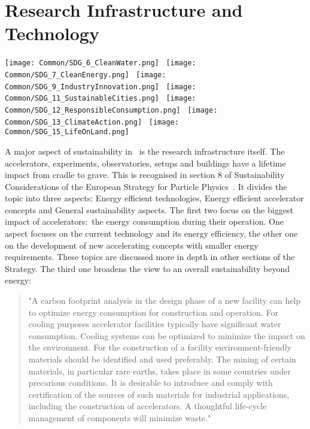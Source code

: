 \documentclass[../SustainableHEP.tex]{subfiles}
\begin{document}
\RaggedRight
\sloppy
\newpage


\section{Research Infrastructure and Technology}
\label{sec:Technology}


\begin{center}
    \texttt{[image: Common/SDG\_6\_CleanWater.png]}~%
    \texttt{[image: Common/SDG\_7\_CleanEnergy.png]}~%
    \texttt{[image: Common/SDG\_9\_IndustryInnovation.png]}~%
    \texttt{[image: Common/SDG\_11\_SustainableCities.png]}~%
    \texttt{[image: Common/SDG\_12\_ResponsibleConsumption.png]}~%
    \texttt{[image: Common/SDG\_13\_ClimateAction.png]}~%
    \texttt{[image: Common/SDG\_15\_LifeOnLand.png]}
\end{center}


\exSum

\noindent A major aspect of sustainability in \ACR\ is the research infrastructure itself. The accelerators, experiments, observatories, setups and buildings have a lifetime impact from cradle to grave. This is recognised in section 8 of Sustainability Considerations of the European Strategy for Particle Physics~\cite{EuropStrategyPP}.
It divides the topic into three aspects: Energy efficient technologies, Energy efficient accelerator concepts and General sustainability aspects. The first two focus on the biggest impact of accelerators:\ the energy consumption during their operation. One aspect focuses on the current technology and its energy efficiency, the other one on the development of new accelerating concepts with smaller energy requirements. These topics are discussed more in depth in other sections of the Strategy. The third one broadens the view to an overall sustainability beyond energy:

\begin{quotation}
    "A carbon footprint analysis in the design phase of a new facility can help to optimize energy consumption for construction and operation. For cooling purposes accelerator facilities typically have significant water consumption. Cooling systems can be optimized to minimize the impact on the environment. For the construction of a facility environment-friendly materials should be identified and used preferably. The mining of certain materials, in particular rare earths, takes place in some countries under precarious conditions. It is desirable to introduce and comply with certification of the sources of such materials for industrial applications, including the construction of accelerators. A thoughtful life-cycle management of components will minimize waste."
\end{quotation}
\end{document}
